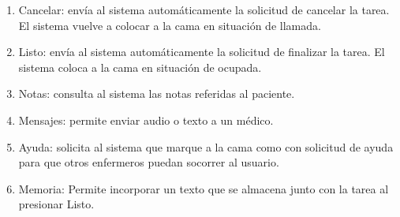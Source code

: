 \begin{enumerate}
\item Cancelar: envía al sistema automáticamente la solicitud de cancelar la tarea. El sistema vuelve a colocar a la cama en situación de llamada.
\item Listo: envía al sistema automáticamente la solicitud de finalizar la tarea. El sistema coloca a la cama en situación de ocupada.
\item Notas: consulta al sistema las notas referidas al paciente. 
\item Mensajes: permite enviar audio o texto a un médico. 
\item Ayuda: solicita al sistema que marque a la cama como con solicitud de ayuda para que otros enfermeros puedan socorrer al usuario. 
\item Memoria: Permite incorporar un texto que se almacena junto con la tarea al presionar Listo.
\end{enumerate}

